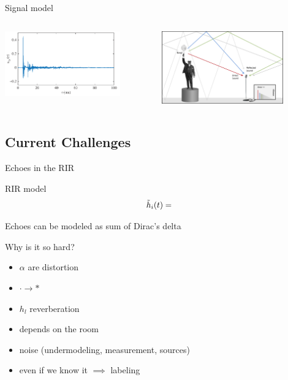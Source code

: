 \begin{frame}[t]{Signal model}
    \begin{columns}
            \centering
            \includegraphics[width=0.8\textwidth]{figures/rir_measured.png}

            \centering
            \includegraphics[width=0.8\textwidth]{figures/rir_bang.png}

    \end{columns}

\end{frame}

\subsection{Current Challenges}

\begin{frame}{Echoes in the RIR}

    RIR model
    \begin{equation}
        \tilde{h}_i(t) =
    \end{equation}

    Echoes can be modeled as sum of Dirac's delta

    Why is it so hard?
    \begin{itemize}
        \item $\alpha$ are distortion
        \item $\cdot \to \ast$
        \item $h_l$ reverberation
        \item depends on the room
        \item noise (undermodeling, measurement, sources)
        \item even if we know it $\implies$ labeling
    \end{itemize}

\end{frame}

